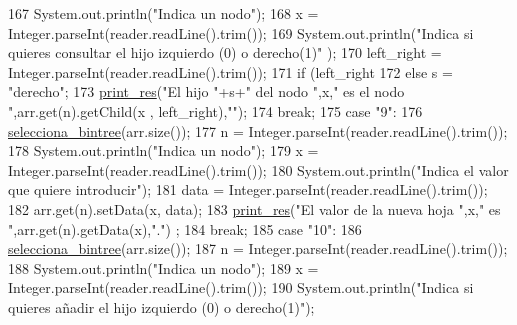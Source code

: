 \begin{DoxyCode}
167                         System.out.println(\textcolor{stringliteral}{"Indica un nodo"});
168                         x = Integer.parseInt(reader.readLine().trim());
169                         System.out.println(\textcolor{stringliteral}{"Indica si quieres consultar el hijo izquierdo (0) o derecho(1)"}
      );
170                         left\_right = Integer.parseInt(reader.readLine().trim());
171                         \textcolor{keywordflow}{if} (left\_right%
172                         \textcolor{keywordflow}{else} s = \textcolor{stringliteral}{"derecho"};
173                         \hyperlink{classdomini_1_1utils_1_1Driver____BinTree_a434e26afb3eb701558d81b0fd1c29dcb}{print\_res}(\textcolor{stringliteral}{"El hijo "}+s+\textcolor{stringliteral}{" del nodo "},x,\textcolor{stringliteral}{" es el nodo "},arr.get(n).getChild(x
      , left\_right),\textcolor{stringliteral}{""});
174                     \textcolor{keywordflow}{break};
175                     \textcolor{keywordflow}{case} \textcolor{stringliteral}{"9"}:
176                         \hyperlink{classdomini_1_1utils_1_1Driver____BinTree_a0d90bf2cb928174547e712140b5a4fe5}{selecciona\_bintree}(arr.size());
177                         n = Integer.parseInt(reader.readLine().trim());
178                         System.out.println(\textcolor{stringliteral}{"Indica un nodo"});
179                         x = Integer.parseInt(reader.readLine().trim());
180                         System.out.println(\textcolor{stringliteral}{"Indica el valor que quiere introducir"});
181                         data = Integer.parseInt(reader.readLine().trim());
182                         arr.get(n).setData(x, data);
183                         \hyperlink{classdomini_1_1utils_1_1Driver____BinTree_a434e26afb3eb701558d81b0fd1c29dcb}{print\_res}(\textcolor{stringliteral}{"El valor de la nueva hoja "},x,\textcolor{stringliteral}{" es "},arr.get(n).getData(x),\textcolor{stringliteral}{"."})
      ;
184                     \textcolor{keywordflow}{break};
185                     \textcolor{keywordflow}{case} \textcolor{stringliteral}{"10"}:
186                         \hyperlink{classdomini_1_1utils_1_1Driver____BinTree_a0d90bf2cb928174547e712140b5a4fe5}{selecciona\_bintree}(arr.size());
187                         n = Integer.parseInt(reader.readLine().trim());
188                         System.out.println(\textcolor{stringliteral}{"Indica un nodo"});
189                         x = Integer.parseInt(reader.readLine().trim());
190                         System.out.println(\textcolor{stringliteral}{"Indica si quieres añadir el hijo izquierdo (0) o derecho(1)"});

\end{DoxyCode}
